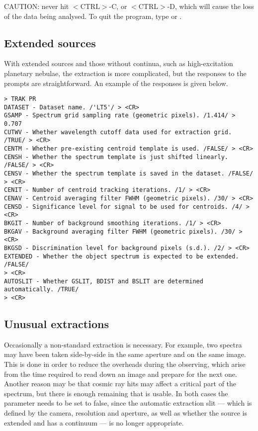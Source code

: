CAUTION: never hit $<$CTRL$>$-C, or $<$CTRL$>$-D, which will cause the loss of
the data being analysed.
To quit the program, type  or 
\@.

\subsection{Extended sources}

With extended sources and those without continua, such as high-excitation
planetary nebulae, the extraction is more complicated, but the responses
to the prompts are straightforward. An example of the responses is given below.

\begin{verbatim}
> TRAK PR
DATASET - Dataset name. /'LT5'/ > <CR>
GSAMP - Spectrum grid sampling rate (geometric pixels). /1.414/ > 0.707
CUTWV - Whether wavelength cutoff data used for extraction grid. /TRUE/ > <CR>
CENTM - Whether pre-existing centroid template is used. /FALSE/ > <CR>
CENSH - Whether the spectrum template is just shifted linearly. /FALSE/ > <CR>
CENSV - Whether the spectrum template is saved in the dataset. /FALSE/ > <CR>
CENIT - Number of centroid tracking iterations. /1/ > <CR>
CENAV - Centroid averaging filter FWHM (geometric pixels). /30/ > <CR>
CENSD - Significance level for signal to be used for centroids. /4/ >  <CR>
BKGIT - Number of background smoothing iterations. /1/ > <CR>
BKGAV - Background averaging filter FWHM (geometric pixels). /30/ > <CR>
BKGSD - Discrimination level for background pixels (s.d.). /2/ > <CR>
EXTENDED - Whether the object spectrum is expected to be extended. /FALSE/
> <CR>
AUTOSLIT - Whether GSLIT, BDIST and BSLIT are determined automatically. /TRUE/
> <CR>
\end{verbatim}

\subsection{Unusual extractions}

Occasionally a non-standard extraction is necessary.  For example, two spectra
may have been taken side-by-side in the same aperture and on the same image.
This is done in order to reduce the overheads during the observing, which arise
from the time required to read down an image and prepare for the next one.
Another reason may be that cosmic ray hits may affect a critical part of the
spectrum, but there is enough remaining that is usable.  In both cases the
 parameter needs to be set to false, 
since the automatic
extraction slit --- which is defined by the camera, resolution and aperture,
as well as whether the source is extended and has a continuum --- is no longer
appropriate.

